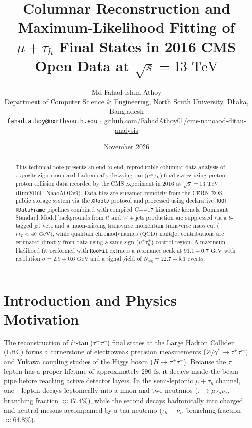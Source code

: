 \documentclass[11pt,a4paper]{article}
\title{\textbf{Columnar Reconstruction and Maximum-Likelihood Fitting of $\mu + \tau_h$ Final States in 2016 CMS Open Data at $\sqrt{s} = 13\text{ TeV}$}}
\author{Md Fahad Islam Athoy\\Department of Computer Science \& Engineering, North South University, Dhaka, Bangladesh\\\texttt{fahad.athoy@northsouth.edu} $\cdot$ \href{https://github.com/FahadAthoy01/cms-nanoaod-ditau-analysis}{github.com/FahadAthoy01/cms-nanoaod-ditau-analysis}}
\date{November 2026}
\begin{document}
\maketitle

\begin{abstract}
This technical note presents an end-to-end, reproducible columnar data analysis of opposite-sign muon and hadronically decaying tau ($\mu^\pm\tau_h^\mp$) final states using proton-proton collision data recorded by the CMS experiment in 2016 at $\sqrt{s} = 13\text{ TeV}$ (Run2016H NanoAODv9). Data files are streamed remotely from the CERN EOS public storage system via the \texttt{XRootD} protocol and processed using declarative \texttt{ROOT RDataFrame} pipelines combined with compiled C++17 kinematic kernels. Dominant Standard Model backgrounds from $t\bar{t}$ and $W+\text{jets}$ production are suppressed via a $b$-tagged jet veto and a muon-missing transverse momentum transverse mass cut ($m_T < 40\text{ GeV}$), while quantum chromodynamics (QCD) multijet contributions are estimated directly from data using a same-sign ($\mu^\pm\tau_h^\pm$) control region. A maximum-likelihood fit performed with \texttt{RooFit} extracts a resonance peak at $91.1 \pm 0.7\text{ GeV}$ with resolution $\sigma = 2.9 \pm 0.6\text{ GeV}$ and a signal yield of $N_{\text{sig}} = 22.7 \pm 5.1$ events.
\end{abstract}

\section{Introduction and Physics Motivation}
The reconstruction of di-tau ($\tau^+\tau^-$) final states at the Large Hadron Collider (LHC) forms a cornerstone of electroweak precision measurements ($Z/\gamma^* \to \tau^+\tau^-$) and Yukawa coupling studies of the Higgs boson ($H \to \tau^+\tau^-$). Because the $\tau$ lepton has a proper lifetime of approximately $290\text{ fs}$, it decays inside the beam pipe before reaching active detector layers. In the semi-leptonic $\mu + \tau_h$ channel, one $\tau$ lepton decays leptonically into a muon and two neutrinos ($\tau \to \mu\nu_\mu\nu_\tau$, branching fraction $\approx 17.4\%$), while the second decays hadronically into charged and neutral mesons accompanied by a tau neutrino ($\tau_h + \nu_\tau$, branching fraction $\approx 64.8\%$).
\end{document}
